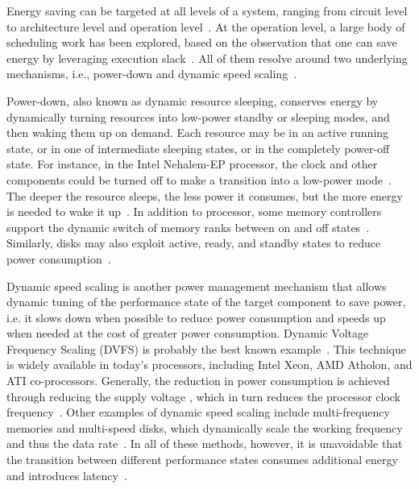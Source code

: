 Energy saving can be targeted at all levels of a system, ranging from circuit level to architecture level and operation level~\cite{mittal2014power,Villa2014}. At the operation level, a large body of scheduling work has been explored, based on the observation that one can save energy by leveraging execution slack~\cite{ge2007cpu,hsu2005power,huang2009energy,freeh2008just,lim2006adaptive,rountree2009adagio,tiwari2012green}. 
All of them resolve around two underlying mechanisms, i.e., power-down and dynamic speed scaling~\cite{Albers:2010:EA:1735223.1735245,liu2010survey}. 


Power-down, also known as dynamic resource sleeping, conserves energy by dynamically turning resources into low-power standby or sleeping modes, and then waking them up on demand.  Each resource may be in an active running state, or in one of intermediate sleeping states, or in the completely power-off state.
For instance, in the Intel Nehalem-EP processor, the clock and other components could be turned off to make a transition into a low-power mode~\cite{liu2010survey}. The deeper the resource sleeps, the less power it consumes, but the more energy is
needed to wake it up~\cite{Albers:2010:EA:1735223.1735245}. In addition to processor, some memory controllers support the dynamic switch of memory ranks between on and off states~\cite{pandey2006dma}. Similarly, disks may also exploit active, ready, and standby states to reduce power consumption~\cite{colarelli2002massive,pinheiro2006exploiting}.

Dynamic speed scaling is another power management mechanism that allows dynamic tuning of the performance state of the target component to save power, i.e. it slows down when possible to reduce power consumption and speeds up when needed at the cost of greater power consumption.
Dynamic Voltage Frequency Scaling (DVFS) is probably the best known example~\cite{Eyerman:2011:FDU:1952998.1952999,4658633,qi_2010_global,rountree2009adagio,freeh2008just,tiwari2012green,lim2006adaptive,elnozahy2003energy,pillai2001real,flautner2001automatic}. 
This technique is widely available in today's processors, including Intel Xeon, AMD Atholon, and ATI co-processors. 
Generally, the reduction in power consumption is achieved through reducing the supply voltage , which in turn reduces the processor clock frequency~\cite{venkatachalam2005power}. 
Other examples of dynamic speed scaling include multi-frequency memories and multi-speed disks, which dynamically scale the working frequency and thus the data rate~\cite{david2011memory,gurumurthi2003drpm,carrera2003conserving}.
In all of these methods, however, it is unavoidable that the transition between different performance states consumes additional energy and introduces latency~\cite{venkatachalam2005power}.





